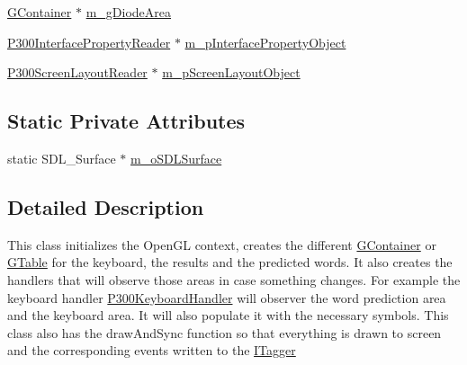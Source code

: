 \begin{DoxyCompactItemize}
\item 
\hyperlink{classOpenViBEApplications_1_1GContainer}{GContainer} $\ast$ \hyperlink{classOpenViBEApplications_1_1P300MainContainer_a46275892de0b86a60e99bd4e1402e686}{m\_\-gDiodeArea}
\item 
\hyperlink{classOpenViBEApplications_1_1P300InterfacePropertyReader}{P300InterfacePropertyReader} $\ast$ \hyperlink{classOpenViBEApplications_1_1P300MainContainer_a0c82050dab1b1bad1cc7957ad8455f5e}{m\_\-pInterfacePropertyObject}
\item 
\hyperlink{classOpenViBEApplications_1_1P300ScreenLayoutReader}{P300ScreenLayoutReader} $\ast$ \hyperlink{classOpenViBEApplications_1_1P300MainContainer_a4ad545db272667dc7384daaac6866e39}{m\_\-pScreenLayoutObject}
\end{DoxyCompactItemize}
\subsection*{Static Private Attributes}
\begin{DoxyCompactItemize}
\item 
static SDL\_\-Surface $\ast$ \hyperlink{classOpenViBEApplications_1_1P300MainContainer_a677b182f627d403aa79fcdf32d573e3c}{m\_\-oSDLSurface}
\end{DoxyCompactItemize}


\subsection{Detailed Description}
This class initializes the OpenGL context, creates the different \hyperlink{classOpenViBEApplications_1_1GContainer}{GContainer} or \hyperlink{classOpenViBEApplications_1_1GTable}{GTable} for the keyboard, the results and the predicted words. It also creates the handlers that will observe those areas in case something changes. For example the keyboard handler \hyperlink{classOpenViBEApplications_1_1P300KeyboardHandler}{P300KeyboardHandler} will observer the word prediction area and the keyboard area. It will also populate it with the necessary symbols. This class also has the drawAndSync function so that everything is drawn to screen and the corresponding events written to the \hyperlink{classOpenViBEApplications_1_1ITagger}{ITagger} 


